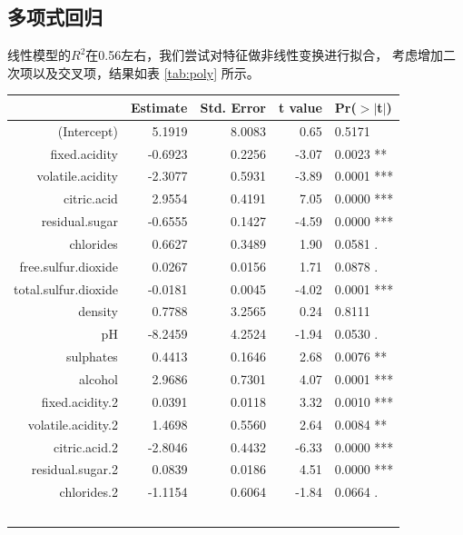 \documentclass[fontset=ubuntu]{ctexart}
\begin{document}
        \subsection{多项式回归}
            线性模型的$R^2$在0.56左右，我们尝试对特征做非线性变换进行拟合，
            考虑增加二次项以及交叉项，结果如表 \ref{tab:poly} 所示。
            \begin{table}[ht]
                \centering
                \begin{tabular}{rrrrl}
                    \hline
                    & Estimate & Std. Error & t value & Pr($>$$|$t$|$) \\ 
                    \hline
                    (Intercept) & 5.1919 & 8.0083 & 0.65 & 0.5171 \\ 
                    fixed.acidity & -0.6923 & 0.2256 & -3.07 & 0.0023 ** \\ 
                    volatile.acidity & -2.3077 & 0.5931 & -3.89 & 0.0001 *** \\ 
                    citric.acid & 2.9554 & 0.4191 & 7.05 & 0.0000 *** \\ 
                    residual.sugar & -0.6555 & 0.1427 & -4.59 & 0.0000 *** \\ 
                    chlorides & 0.6627 & 0.3489 & 1.90 & 0.0581 . \\ 
                    free.sulfur.dioxide & 0.0267 & 0.0156 & 1.71 & 0.0878 . \\ 
                    total.sulfur.dioxide & -0.0181 & 0.0045 & -4.02 & 0.0001 *** \\ 
                    density & 0.7788 & 3.2565 & 0.24 & 0.8111 \\ 
                    pH & -8.2459 & 4.2524 & -1.94 & 0.0530 . \\ 
                    sulphates & 0.4413 & 0.1646 & 2.68 & 0.0076 ** \\ 
                    alcohol & 2.9686 & 0.7301 & 4.07 & 0.0001 *** \\ 
                    fixed.acidity.2 & 0.0391 & 0.0118 & 3.32 & 0.0010 *** \\ 
                    volatile.acidity.2 & 1.4698 & 0.5560 & 2.64 & 0.0084 ** \\ 
                    citric.acid.2 & -2.8046 & 0.4432 & -6.33 & 0.0000 *** \\ 
                    residual.sugar.2 & 0.0839 & 0.0186 & 4.51 & 0.0000 *** \\ 
                    chlorides.2 & -1.1154 & 0.6064 & -1.84 & 0.0664 .\\ 
$$
\end{tabular}
\end{table}
\end{document}
